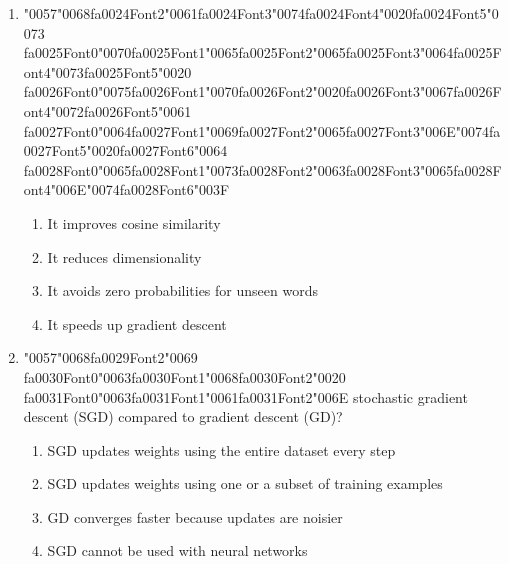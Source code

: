 \documentclass[12pt]{article}
\begin{document}
\begin{enumerate}[label=Q\arabic*.]
\item {\char"0057}{\char"0068}{\csname fa0024Font2\endcsname\char"0061}{\csname fa0024Font3\endcsname\char"0074}{\csname fa0024Font4\endcsname\char"0020}{\csname fa0024Font5\endcsname\char"0073} {\csname fa0025Font0\endcsname\char"0070}{\csname fa0025Font1\endcsname\char"0065}{\csname fa0025Font2\endcsname\char"0065}{\csname fa0025Font3\endcsname\char"0064}{\csname fa0025Font4\endcsname\char"0073}{\csname fa0025Font5\endcsname\char"0020} {\csname fa0026Font0\endcsname\char"0075}{\csname fa0026Font1\endcsname\char"0070}{\csname fa0026Font2\endcsname\char"0020}{\csname fa0026Font3\endcsname\char"0067}{\csname fa0026Font4\endcsname\char"0072}{\csname fa0026Font5\endcsname\char"0061} {\csname fa0027Font0\endcsname\char"0064}{\csname fa0027Font1\endcsname\char"0069}{\csname fa0027Font2\endcsname\char"0065}{\csname fa0027Font3\endcsname\char"006E}{\char"0074}{\csname fa0027Font5\endcsname\char"0020}{\csname fa0027Font6\endcsname\char"0064} {\csname fa0028Font0\endcsname\char"0065}{\csname fa0028Font1\endcsname\char"0073}{\csname fa0028Font2\endcsname\char"0063}{\csname fa0028Font3\endcsname\char"0065}{\csname fa0028Font4\endcsname\char"006E}{\char"0074}{\csname fa0028Font6\endcsname\char"003F}
\begin{enumerate}[label=(\Alph*)]
    \item It improves cosine similarity
    \item It reduces dimensionality
    \item It avoids zero probabilities for unseen words
    \item It speeds up gradient descent
\end{enumerate}
\item {\char"0057}{\char"0068}{\csname fa0029Font2\endcsname\char"0069} {\csname fa0030Font0\endcsname\char"0063}{\csname fa0030Font1\endcsname\char"0068}{\csname fa0030Font2\endcsname\char"0020} {\csname fa0031Font0\endcsname\char"0063}{\csname fa0031Font1\endcsname\char"0061}{\csname fa0031Font2\endcsname\char"006E} stochastic gradient descent (SGD) compared to gradient descent (GD)?
\begin{enumerate}[label=(\Alph*)]
    \item SGD updates weights using the entire dataset every step
    \item SGD updates weights using one or a subset of training examples
    \item GD converges faster because updates are noisier
    \item SGD cannot be used with neural networks

\end{enumerate}
\end{enumerate}
\end{document}

